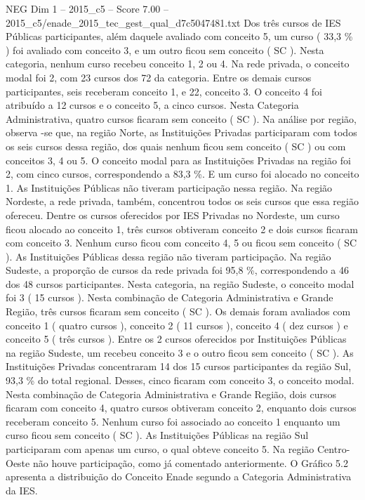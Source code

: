 \begin{textsample}{NEG Dim 1 – 2015\_c5 – Score 7.00 – 2015\_c5/enade\_2015\_tec\_gest\_qual\_d7c5047481.txt}
Dos três cursos de IES Públicas participantes, além daquele avaliado com conceito 5, um curso ( 33,3 \% ) foi avaliado com conceito 3, e um outro ficou sem conceito ( SC ).
Nesta categoria, nenhum curso recebeu conceito 1, 2 ou 4.
Na rede privada, o conceito modal foi 2, com 23 cursos dos 72 da categoria.
Entre os demais cursos participantes, seis receberam conceito 1, e 22, conceito 3.
O conceito 4 foi atribuído a 12 cursos e o conceito 5, a cinco cursos.
Nesta Categoria Administrativa, quatro cursos ficaram sem conceito ( SC ).
Na análise por região, observa -se que, na região Norte, as Instituições Privadas participaram com todos os seis cursos dessa região, dos quais nenhum ficou sem conceito ( SC ) ou com conceitos 3, 4 ou 5.
O conceito modal para as Instituições Privadas na região foi 2, com cinco cursos, correspondendo a 83,3 \%.
E um curso foi alocado no conceito 1.
As Instituições Públicas não tiveram participação nessa região.
Na região Nordeste, a rede privada, também, concentrou todos os seis cursos que essa região ofereceu.
Dentre os cursos oferecidos por IES Privadas no Nordeste, um curso ficou alocado ao conceito 1, três cursos obtiveram conceito 2 e dois cursos ficaram com conceito 3.
Nenhum curso ficou com conceito 4, 5 ou ficou sem conceito ( SC ).
As Instituições Públicas dessa região não tiveram participação.
Na região Sudeste, a proporção de cursos da rede privada foi 95,8 \%, correspondendo a 46 dos 48 cursos participantes.
Nesta categoria, na região Sudeste, o conceito modal foi 3 ( 15 cursos ).
Nesta combinação de Categoria Administrativa e Grande Região, três cursos ficaram sem conceito ( SC ).
Os demais foram avaliados com conceito 1 ( quatro cursos ), conceito 2 ( 11 cursos ), conceito 4 ( dez cursos ) e conceito 5 ( três cursos ).
Entre os 2 cursos oferecidos por Instituições Públicas na região Sudeste, um recebeu conceito 3 e o outro ficou sem conceito ( SC ).
As Instituições Privadas concentraram 14 dos 15 cursos participantes da região Sul, 93,3 \% do total regional.
Desses, cinco ficaram com conceito 3, o conceito modal.
Nesta combinação de Categoria Administrativa e Grande Região, dois cursos ficaram com conceito 4, quatro cursos obtiveram conceito 2, enquanto dois cursos receberam conceito 5.
Nenhum curso foi associado ao conceito 1 enquanto um curso ficou sem conceito ( SC ).
As Instituições Públicas na região Sul participaram com apenas um curso, o qual obteve conceito 5.
Na região Centro-Oeste não houve participação, como já comentado anteriormente.
O Gráfico 5.2 apresenta a distribuição do Conceito Enade segundo a Categoria Administrativa da IES.

\end{textsample}
